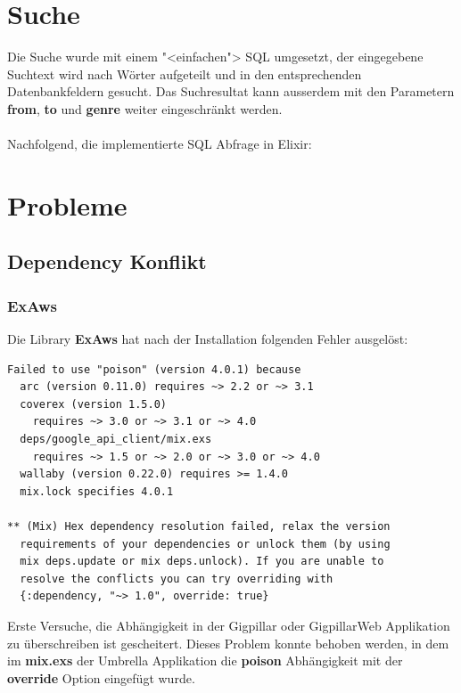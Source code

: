 \clearpage
\section{Suche}

Die Suche wurde mit einem "<einfachen"> SQL umgesetzt, der eingegebene
Suchtext wird nach Wörter aufgeteilt und in den entsprechenden Datenbankfeldern
gesucht.
Das Suchresultat kann ausserdem mit den Parametern \textbf{from},
\textbf{to} und \textbf{genre} weiter eingeschränkt werden.\\
\\
\noindent{}Nachfolgend, die implementierte SQL Abfrage in Elixir:



\clearpage
\section{Probleme}\label{AppendixRealisierungProbleme}

\subsection{Dependency Konflikt}

\subsubsection{ExAws}

Die Library \textbf{ExAws} hat nach der Installation folgenden Fehler ausgelöst:

\begin{lstlisting}[frame=single]
Failed to use "poison" (version 4.0.1) because
  arc (version 0.11.0) requires ~> 2.2 or ~> 3.1
  coverex (version 1.5.0)
    requires ~> 3.0 or ~> 3.1 or ~> 4.0
  deps/google_api_client/mix.exs
    requires ~> 1.5 or ~> 2.0 or ~> 3.0 or ~> 4.0
  wallaby (version 0.22.0) requires >= 1.4.0
  mix.lock specifies 4.0.1

** (Mix) Hex dependency resolution failed, relax the version
  requirements of your dependencies or unlock them (by using
  mix deps.update or mix deps.unlock). If you are unable to
  resolve the conflicts you can try overriding with
  {:dependency, "~> 1.0", override: true}
\end{lstlisting}

Erste Versuche, die Abhängigkeit in der Gigpillar oder GigpillarWeb Applikation
zu überschreiben ist gescheitert.
Dieses Problem konnte behoben werden, in dem im \textbf{mix.exs} der Umbrella
Applikation die \textbf{poison} Abhängigkeit mit der \textbf{override} Option
eingefügt wurde.

